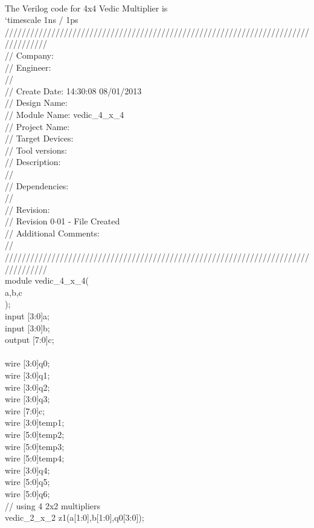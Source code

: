 \\
The Verilog code for 4x4 Vedic Multiplier is\\
`timescale 1ns / 1ps\\
//////////////////////////////////////////////////////////////////////////////////\\
// Company: \\
// Engineer: \\
// \\
// Create Date:    14:30:08 08/01/2013 \\
// Design Name: \\
// Module Name:    vedic\_4\_x\_4 \\
// Project Name: \\
// Target Devices: \\
// Tool versions: \\
// Description: \\
//\\
// Dependencies: \\
//\\
// Revision: \\
// Revision 0$ \cdot $01 - File Created\\
// Additional Comments: \\
//\\
//////////////////////////////////////////////////////////////////////////////////\\
module vedic\_4\_x\_4(\\
a,b,c\\
    );\\
input [3:0]a;\\
input [3:0]b;\\
output [7:0]c;\\
\\
wire [3:0]q0;	\\
wire [3:0]q1;	\\
wire [3:0]q2;\\
wire [3:0]q3;	\\
wire [7:0]c;\\
wire [3:0]temp1;\\
wire [5:0]temp2;\\
wire [5:0]temp3;\\
wire [5:0]temp4;\\
wire [3:0]q4;\\
wire [5:0]q5;\\
wire [5:0]q6;\\
// using 4 2x2 multipliers\\
vedic\_2\_x\_2 z1(a[1:0],b[1:0],q0[3:0]);\\

